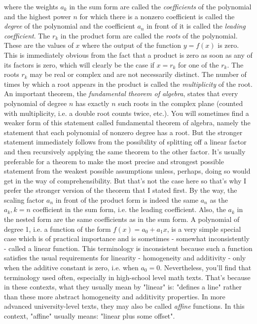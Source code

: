 where the weights $a_k$ in the sum form are called the \emph{coefficients} of the polynomial and the highest power $n$ for which there is a nonzero coefficient is called the \emph{degree} of the polynomial and the coefficient $a_n$ in front of it is called the \emph{leading coefficient}. The $r_k$ in the product form are called the \emph{roots} of the polynomial. These are the values of $x$ where the output of the function $y = f(x)$ is zero. This is immediately obvious from the fact that a product is zero as soon as any of its factors is zero, which will clearly be the case if $x = r_k$ for one of the $r_k$. The roots $r_k$ may be real or complex and are not necessarily distinct. The number of times by which a root appears in the product is called the \emph{multiplicity} of the root. An important theorem, the \emph{fundamental theorem of algebra}, states that every polynomial of degree $n$ has exactly $n$ such roots in the complex plane (counted with multiplicity, i.e. a double root counts twice, etc.). You will sometimes find a weaker form of this statement called fundamental theorem of algebra, namely the statement that each polynomial of nonzero degree has a root. But the stronger statement immediately follows from the possibility of splitting off a linear factor and then recursively applying the same theorem to the other factor. It's usually preferable for a theorem to make the most precise and strongest possible statement from the weakest possible assumptions unless, perhaps, doing so would get in the way of comprehensibility. But that's not the case here so that's why I prefer the stronger version of the theorem that I stated first. By the way, the scaling factor $a_n$ in front of the product form is indeed the same $a_n$ as the $a_k, k=n$ coefficient in the sum form, i.e. the leading coefficient. Also, the $a_k$ in the nested form are the same coefficients as in the sum form. A polynomial of degree 1, i.e. a function of the form $f(x) = a_0 + a_1  x$, is a very simple special case which is of practical importance and is sometimes - somewhat inconsistently - called a linear function. This terminology is inconsistent because such a function satisfies the usual requirements for linearity - homogeneity and additivity - only when the additive constant is zero, i.e. when $a_0 = 0$. Nevertheless, you'll find that terminology used often, especially in high-school level math texts. That's because in these contexts, what they usually mean by "linear" is: "defines a line" rather than these more abstract homogeneity and additivity properties. In more advanced university-level texts, they may also be called \emph{affine} functions. In this context, "affine" usually means: "linear plus some offset". 

